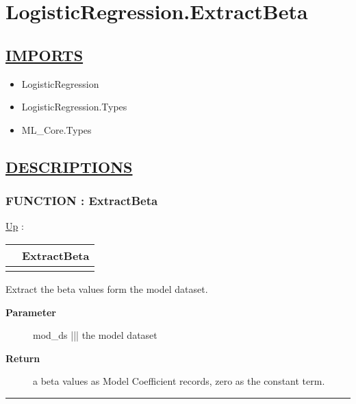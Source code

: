 \chapter*{LogisticRegression.ExtractBeta}
\hypertarget{ecldoc:toc:LogisticRegression.ExtractBeta}{}

\section*{\underline{IMPORTS}}
\begin{itemize}
\item LogisticRegression
\item LogisticRegression.Types
\item ML\_Core.Types
\end{itemize}

\section*{\underline{DESCRIPTIONS}}
\subsection*{FUNCTION : ExtractBeta}
\hypertarget{ecldoc:logisticregression.extractbeta}{}
\hyperlink{ecldoc:toc:LogisticRegression}{Up} :

{\renewcommand{\arraystretch}{1.5}
\begin{tabularx}{\textwidth}{|>{\raggedright\arraybackslash}l|X|}
\hline
\hspace{0pt} & ExtractBeta \\
\hline
\multicolumn{2}{|>{\raggedright\arraybackslash}X|}{\hspace{0pt}(DATASET(Core\_Types.Layout\_Model) mod\_ds)} \\
\hline
\end{tabularx}
}

\par
Extract the beta values form the model dataset.

\par
\begin{description}
\item [\textbf{Parameter}] mod\_ds ||| the model dataset
\item [\textbf{Return}] a beta values as Model Coefficient records, zero as the constant term.
\end{description}

\rule{\linewidth}{0.5pt}
